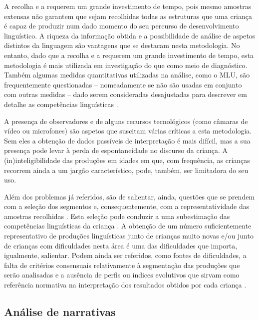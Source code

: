 \documentclass[output=paper]{LSP/langsci}
\begin{document}
A recolha e a  requerem um grande investimento de tempo, pois mesmo amostras extensas não garantem que sejam recolhidas todas as estruturas que uma criança é capaz de produzir num dado momento do seu percurso de desenvolvimento linguístico. A riqueza da informação obtida e a possibilidade de análise de aspetos distintos da linguagem são vantagens que se destacam nesta metodologia. No entanto, dado que a recolha e a  requerem um grande investimento de tempo, esta metodologia é mais utilizada em investigação do que como meio de diagnóstico. Também algumas medidas quantitativas utilizadas na análise, como o MLU, são frequentemente questionadas – nomeadamente se não são usadas em conjunto com outras medidas – dado serem consideradas desajustadas para descrever em detalhe as competências linguísticas \citep{lee1974,leecanter1971,nelson1973,owens2012}. 

A presença de observadores e de alguns recursos tecnológicos (como câmaras de vídeo ou microfones) são aspetos que suscitam várias críticas a esta metodologia. Sem eles a obtenção de dados passíveis de interpretação é mais difícil, mas a sua presença pode levar à perda de espontaneidade no discurso da criança. A (in)inteligibilidade das produções em idades em que, com frequência, as crianças recorrem ainda a um jargão característico, pode, também, ser limitadora do seu uso.

\largerpage Além dos problemas já referidos, são de salientar, ainda, questões que se prendem com a seleção dos segmentos e, consequentemente, com a representatividade das amostras recolhidas \citep{owens2012}. Esta seleção pode conduzir a uma subestimação das competências linguísticas da criança \citep{demuth1998}. A obtenção de um número suficientemente representativo de produções linguísticas junto de crianças muito novas e/ou junto de crianças com dificuldades nesta área é uma das dificuldades que importa, igualmente, salientar. Podem ainda ser referidos, como fontes de dificuldades, a falta de critérios consensuais relativamente à segmentação das produções que serão analisadas e a ausência de perfis ou índices evolutivos que sirvam como referência normativa na interpretação dos resultados obtidos por cada criança \citep{acosta2006}. 

\subsection{Análise de narrativas}
\label{subsec:viana_analise_narrativas}
\end{document}
